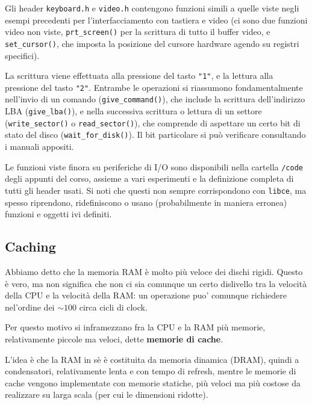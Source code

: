 \documentclass[a4paper,11pt]{article}
\begin{document}
Gli header \lstinline|keyboard.h| e \lstinline|video.h| contengono funzioni simili a quelle viste negli esempi precedenti per l'interfacciamento con tastiera e video (ci sono due funzioni video non viste, \lstinline|prt_screen()| per la scrittura di tutto il buffer video, e \lstinline|set_cursor()|, che imposta la posizione del cursore hardware agendo su registri specifici).

La scrittura viene effettuata alla pressione del tasto \lstinline|"1"|, e la lettura alla pressione del tasto \lstinline|"2"|.
Entrambe le operazioni si riassumono fondamentalmente nell'invio di un comando (\lstinline|give_command()|), che include la scrittura dell'indirizzo LBA (\lstinline|give_lba()|), e nella successiva scrittura o lettura di un settore (\lstinline|write_sector()| o \lstinline|read_sector()|), che comprende di aspettare un certo bit di stato del disco (\lstinline|wait_for_disk()|).
Il bit particolare si può verificare consultando i manuali appositi.

Le funzioni viste finora su periferiche di I/O sono disponibili nella cartella \lstinline|/code| degli appunti del corso, assieme a vari esperimenti e la definizione completa di tutti gli header usati.
Si noti che questi non sempre corrispondono con \lstinline|libce|, ma spesso riprendono, ridefiniscono o usano (probabilmente in maniera erronea) funzioni e oggetti ivi definiti.

\subsection{Caching}
Abbiamo detto che la memoria RAM è molto più veloce dei dischi rigidi.
Questo è vero, ma non significa che non ci sia comunque un certo dislivello tra la velocità della CPU e la velocità della RAM: un operazione puo' comunque richiedere nel'ordine dei $\sim 100$ circa cicli di clock.

Per questo motivo si inframezzano fra la CPU e la RAM più memorie, relativamente piccole ma veloci, dette \textbf{memorie di cache}.

L'idea è che la RAM in sè è costituita da memoria dinamica (DRAM), quindi a condensatori, relativamente lenta e con tempo di refresh, mentre le memorie di cache vengono implementate con memorie statiche, più veloci ma più costose da realizzare su larga scala (per cui le dimensioni ridotte).
\end{document}
